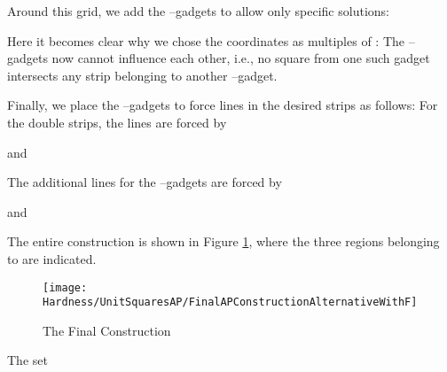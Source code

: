 \documentclass[12pt]{article}
\begin{document}
Around this grid, we add the --gadgets to allow only specific solutions:


Here it becomes clear why we chose the coordinates as multiples of : The --gadgets now cannot influence each other, i.e., no square from one such gadget intersects any strip belonging to another --gadget.
 
Finally, we place the --gadgets to force lines in the desired strips as follows: For the double strips, the lines are forced by

 
and

 
The additional lines for the --gadgets are forced by

and

The entire construction is shown in Figure \ref{fig:FinalAPConstruction}, where the three regions  belonging to  are indicated.
\begin{figure}
	\centering
		\texttt{[image: Hardness/UnitSquaresAP/FinalAPConstructionAlternativeWithF]}
	\caption{The Final Construction}
	\label{fig:FinalAPConstruction}
\end{figure}
The set
 
\end{document}
